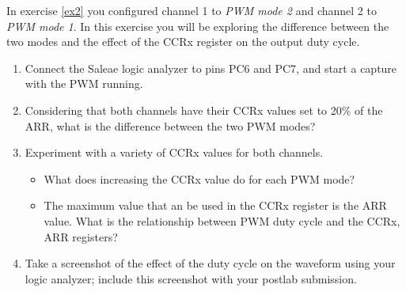 \documentclass[openany,11pt,fleqn]{book} %
\begin{document}
\begin{exercise}
    In exercise \ref{ex2} you configured channel 1 to \textit{PWM mode 2} and channel 2 to \textit{PWM mode 1}. In this exercise you will be exploring the difference between the two modes and the effect of the CCRx register on the output duty cycle. 
    
    \begin{enumerate}
        \item Connect the Saleae logic analyzer to pins PC6 and PC7, and start a capture with the PWM running.
        \item Considering that both channels have their CCRx values set to 20\% of the ARR, what is the difference between the two PWM modes?
        \item Experiment with a variety of CCRx values for both channels. 
        \begin{itemize}
            \item What does increasing the CCRx value do for each PWM mode?
            \item The maximum value that an be used in the CCRx register is the ARR value. What is the relationship between PWM duty cycle and the CCRx, ARR registers?
        \end{itemize}
    \item Take a screenshot of the effect of the duty cycle on the waveform using your logic analyzer; include this screenshot with your postlab submission.
    \end{enumerate}
    
\end{exercise}
\end{document}
